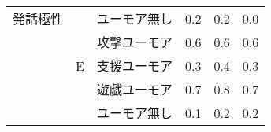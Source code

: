 \begin{table}
\begin{center}
\begin{tabular}{|c|c|c|p{6em}|p{6em}|p{6em}|}
発話極性 &  & ユーモア無し & \hspace{2.4zw}0.2 & \hspace{2.4zw}0.2 & \hspace{2.4zw}0.0 \\\cline{2-6}
 &  & 攻撃ユーモア & \hspace{2.4zw}0.6 & \hspace{2.4zw}0.6 & \hspace{2.4zw}0.6 \\\cline{3-6}
 & E & 支援ユーモア & \hspace{2.4zw}0.3 & \hspace{2.4zw}0.4 & \hspace{2.4zw}0.3 \\\cline{3-6}
 &  & 遊戯ユーモア & \hspace{2.4zw}0.7 & \hspace{2.4zw}0.8 & \hspace{2.4zw}0.7 \\\cline{3-6}
 &  & ユーモア無し & \hspace{2.4zw}0.1 & \hspace{2.4zw}0.2 & \hspace{2.4zw}0.2 \\\hline
\end{tabular}
\end{center}
\end{table}


